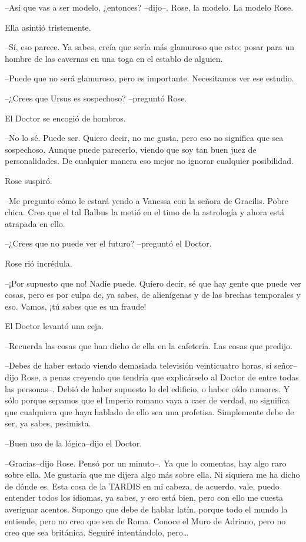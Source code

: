 --Así que vas a ser modelo, ¿entonces? --dijo--. Rose, la modelo. La
modelo Rose.

Ella asintió tristemente.

--Sí, eso parece. Ya sabes, creía que sería más glamuroso que esto:
posar para un hombre de las cavernas en una toga en el establo de
alguien.

--Puede que no será glamuroso, pero es importante. Necesitamos ver ese
estudio.

--¿Crees que Ursus es sospechoso? --preguntó Rose.

El Doctor se encogió de hombros.

--No lo sé. Puede ser. Quiero decir, no me gusta, pero eso no significa
que sea sospechoso. Aunque puede parecerlo, viendo que soy tan buen juez
de personalidades. De cualquier manera eso mejor no ignorar cualquier
posibilidad.

Rose suspiró.

--Me pregunto cómo le estará yendo a Vanessa con la señora de Gracilis.
Pobre chica. Creo que el tal Balbus la metió en el timo de la astrología
y ahora está atrapada en ello.

--¿Crees que no puede ver el futuro? --preguntó el Doctor.

Rose rió incrédula.

--¡Por supuesto que no! Nadie puede. Quiero decir, sé que hay gente que
puede ver cosas, pero es por culpa de, ya sabes, de alienígenas y de las
brechas temporales y eso. Vamos, ¡tú sabes que es un fraude!

El Doctor levantó una ceja.

--Recuerda las cosas que han dicho de ella en la cafetería. Las cosas
que predijo.

--Debes de haber estado viendo demasiada televisión veinticuatro horas,
sí señor--dijo Rose, a penas creyendo que tendría que explicárselo al
Doctor de entre todas las personas--. Debió de haber supuesto lo del
edificio, o haber oído rumores. Y sólo porque sepamos que el Imperio
romano vaya a caer de verdad, no significa que cualquiera que haya
hablado de ello sea una profetisa. Simplemente debe de ser, ya sabes,
pesimista.

--Buen uso de la lógica--dijo el Doctor.

--Gracias--dijo Rose. Pensó por un minuto--. Ya que lo comentas, hay
algo raro sobre ella. Me gustaría que me dijera algo más sobre ella. Ni
siquiera me ha dicho de dónde es. Esta cosa de la TARDIS en mi cabeza,
de acuerdo, vale, puedo entender todos los idiomas, ya sabes, y eso está
bien, pero con ello me cuesta averiguar acentos. Supongo que debe de
hablar latín, porque todo el mundo la entiende, pero no creo que sea de
Roma. Conoce el Muro de Adriano, pero no creo que sea británica. Seguiré
intentándolo, pero\ldots{}

